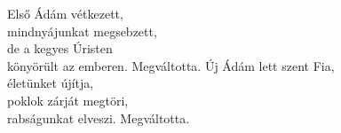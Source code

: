 \documentclass[twoside]{article}
\begin{document}
\begin{hymnstanzas}
  Első Ádám vétkezett,\\
  mindnyájunkat megsebzett,\\
  de a kegyes Úristen\\
  könyörült az emberen. Megváltotta.
\stanzabreak
  Új Ádám lett szent Fia,\\
  életünket újítja,\\
  poklok zárját megtöri,\\
  rabságunkat elveszi. Megváltotta.
\end{hymnstanzas}

\end{document}
